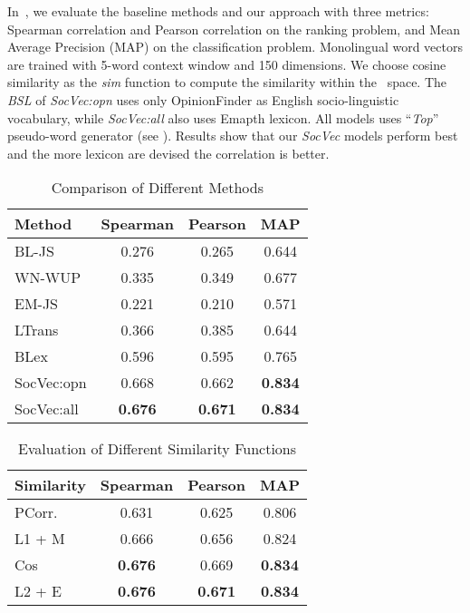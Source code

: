 In~, we evaluate the baseline methods and 
our approach with three metrics: Spearman correlation and 
Pearson correlation on the ranking problem, and Mean Average Precision (MAP)
on the classification problem.  
Monolingual word vectors are trained with 5-word context window and 150 dimensions.
We choose cosine similarity as the \textit{sim} function to compute the similarity within the \socvec~space.
The \textit{BSL} of \textit{SocVec:opn} uses only OpinionFinder as English socio-linguistic vocabulary, while \textit{SocVec:all} also uses Emapth lexicon. All models uses ``\textit{Top}'' pseudo-word generator
(see ).
Results show that our \textit{SocVec} models perform best and 
the more lexicon are devised the correlation is better.
\begin{table}[th]
	\small
	\centering
	\caption{\small Comparison of Different Methods}
	\begin{tabular}{|l|c|c|c|}
		\hline
		\textbf{Method} & \textbf{Spearman} & \textbf{Pearson}  & \textbf{MAP} \\ \hline\hline
		BL-JS& 0.276 & 0.265 & 0.644   \\ \hline
		WN-WUP  & 0.335 & 0.349 & 0.677 \\ \hline
		EM-JS & 0.221 & 0.210  & 0.571\\ \hline
		LTrans& 0.366 & 0.385  & 0.644  \\ \hline
		BLex& 0.596 & 0.595  & 0.765 \\ \hline\hline
		 SocVec:opn& 0.668 & 0.662   & \textbf{0.834} \\ \hline
		 SocVec:all& \textbf{0.676} & \textbf{0.671}  & \textbf{0.834}\\ \hline
	\end{tabular}
	\label{tab:mcdne_res_1}
\end{table}

\begin{table}[th]
	\centering
	\small
	\caption{\small Evaluation of Different Similarity Functions}
	\label{tab:mcdne_res_2}
	\begin{tabular}{|l|c|c|c|}
		\hline
		\textbf{Similarity} & \textbf{Spearman} & \textbf{Pearson}   & \textbf{MAP} \\ \hline\hline
		PCorr. & 0.631 & 0.625 & 0.806\\ \hline
		L1 + M & 0.666 & 0.656 & 0.824 \\  \hline
		Cos & \textbf{0.676} & 0.669 & \textbf{0.834} \\ \hline
		L2 + E & \textbf{0.676} & \textbf{0.671} & \textbf{0.834} \\ \hline
	\end{tabular}
\end{table}


